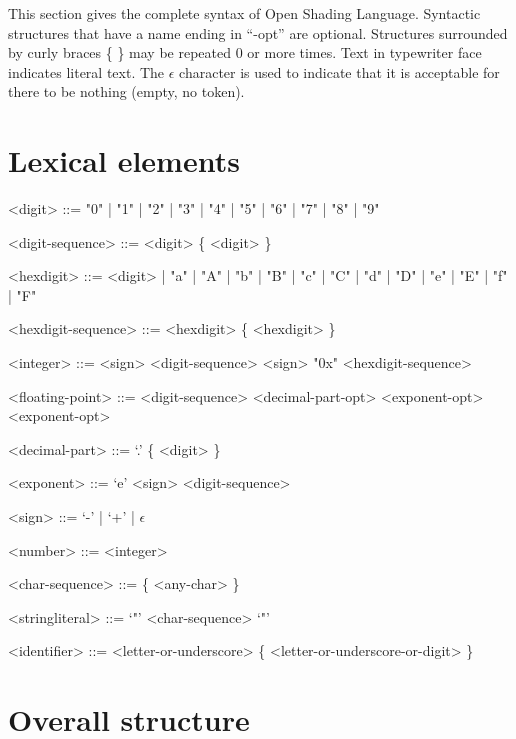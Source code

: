 \documentclass[11pt,letterpaper]{book}
\def\langname{Open Shading Language\xspace}
\begin{document}
This section gives the complete syntax of \langname.  Syntactic
structures that have a name ending in ``-opt'' are optional.  Structures
surrounded by curly braces \{ \} may be repeated 0 or more times.  Text
in {\cf typewriter} face indicates literal text.  The $\epsilon$
character is used to indicate that it is acceptable for there to be
nothing (empty, no token).

\setlength{\grammarindent}{2cm}

\section*{Lexical elements}

\begin{grammar}

<digit> ::= "0" | "1" | "2" | "3" | "4" | "5" | "6" | "7" | "8" | "9"

<digit-sequence> ::= <digit> \{ <digit> \}

<hexdigit> ::= <digit> | "a" | "A" | "b" | "B" | "c" | "C" | "d" | "D" | "e" | "E" | "f" | "F"

<hexdigit-sequence> ::= <hexdigit> \{ <hexdigit> \}

<integer> ::= <sign> <digit-sequence>
\alt <sign> "0x" <hexdigit-sequence>

<floating-point> ::= <digit-sequence> <decimal-part-opt> <exponent-opt>
 <exponent-opt>

<decimal-part> ::= `.' \{ <digit> \}

<exponent> ::= `e' <sign> <digit-sequence>

<sign> ::= `-' | `+' | $\epsilon$

<number> ::= <integer>

<char-sequence> ::= \{ <any-char> \} 

<stringliteral> ::= `"' <char-sequence> `"'

<identifier> ::= <letter-or-underscore> \{ <letter-or-underscore-or-digit> \}

\end{grammar}

\section*{Overall structure}
\end{document}
